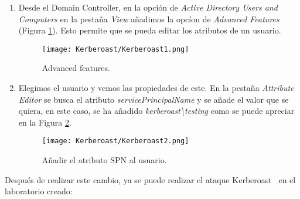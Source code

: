 \begin{enumerate}

\item Desde el Domain Controller, en la opción de {\it Active Directory Users and Computers} en la pestaña {\it View} añadimos la opcíon de {\it Advanced Features} (Figura \ref{Kerberoast1}). Esto permite que se pueda editar los atributos de un usuario. 
\begin{figure}[H] %
\begin{center}
\texttt{[image: Kerberoast/Kerberoast1.png]}
\end{center}
\caption{Advanced features.}
\label{Kerberoast1}
\end{figure}

\item Elegimos el usuario y vemos las propiedades de este. En la pestaña {\it Attribute Editor} se busca el atributo {\it servicePrincipalName} y se añade el valor que se quiera, en este caso, se ha añadido {\it kerberoast\textbackslash{}testing} como se puede apreciar en la Figura \ref{Kerberoast2}.
\begin{figure}[H] %
\begin{center}
\texttt{[image: Kerberoast/Kerberoast2.png]}
\end{center}
\caption{Añadir el atributo SPN al usuario.}
\label{Kerberoast2}
\end{figure}

\end{enumerate}

Después de realizar este cambio, ya se puede realizar el ataque Kerberoast~\cite{Capitulo5:Kerberoast} en el laboratorio creado: 

